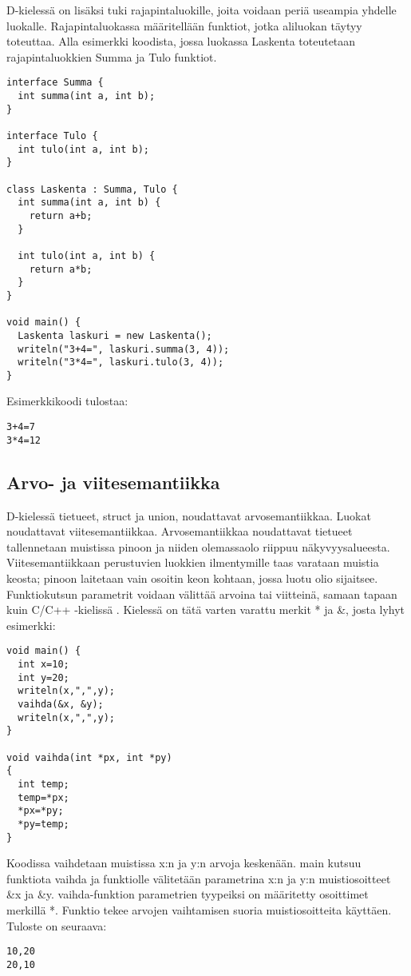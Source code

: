 \documentclass[11pt,oneside,a4paper]{article}
\begin{document}
D-kielessä on lisäksi tuki rajapintaluokille, joita voidaan periä useampia
yhdelle luokalle. Rajapintaluokassa määritellään funktiot, jotka aliluokan
täytyy toteuttaa. Alla esimerkki koodista, jossa luokassa Laskenta toteutetaan
rajapintaluokkien Summa ja Tulo funktiot.

\begin{verbatim}
interface Summa { 
  int summa(int a, int b); 
} 

interface Tulo {
  int tulo(int a, int b);
}

class Laskenta : Summa, Tulo { 
  int summa(int a, int b) { 
    return a+b;
  } 

  int tulo(int a, int b) {
    return a*b;
  }
} 

void main() {
  Laskenta laskuri = new Laskenta();
  writeln("3+4=", laskuri.summa(3, 4));
  writeln("3*4=", laskuri.tulo(3, 4));
}
\end{verbatim}
Esimerkkikoodi tulostaa:
\begin{verbatim}
3+4=7
3*4=12
\end{verbatim}
\subsection{Arvo- ja viitesemantiikka}
D-kielessä tietueet, struct ja union, noudattavat arvosemantiikkaa. Luokat
noudattavat viitesemantiikkaa. Arvosemantiikkaa noudattavat tietueet
tallennetaan muistissa pinoon ja niiden olemassaolo riippuu näkyvyysalueesta.
Viitesemantiikkaan perustuvien luokkien ilmentymille taas varataan muistia
keosta; pinoon laitetaan vain osoitin keon kohtaan, jossa luotu olio sijaitsee.
Funktiokutsun parametrit voidaan välittää arvoina tai viitteinä, samaan tapaan
kuin C/C++ -kielissä \cite{KRR88}. Kielessä on tätä varten varattu merkit * ja
\&, josta lyhyt esimerkki:
\begin{verbatim}
void main() {
  int x=10;
  int y=20;
  writeln(x,",",y);
  vaihda(&x, &y);
  writeln(x,",",y);
}

void vaihda(int *px, int *py)
{
  int temp;
  temp=*px;
  *px=*py;
  *py=temp;
}
\end{verbatim}
Koodissa vaihdetaan muistissa x:n ja y:n arvoja keskenään. main kutsuu funktiota
vaihda ja funktiolle välitetään parametrina x:n ja y:n muistiosoitteet \&x ja
\&y. vaihda-funktion parametrien tyypeiksi on määritetty osoittimet merkillä *.
Funktio tekee arvojen vaihtamisen suoria muistiosoitteita käyttäen. Tuloste on
seuraava:
\begin{verbatim}
10,20
20,10
\end{verbatim}
\end{document}
